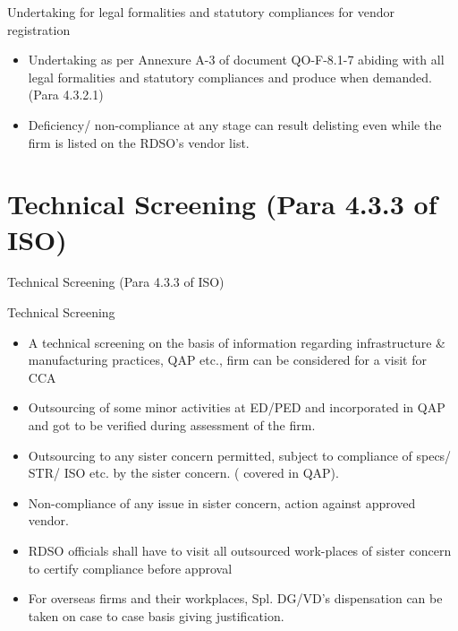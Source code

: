\documentclass[
  10pt,
  ignorenonframetext,
  aspectratio=43,
]{beamer}
\begin{document}
\begin{frame}
\begin{block}{Undertaking for legal formalities and statutory
compliances for vendor registration}
\protect\hypertarget{undertaking-for-legal-formalities-and-statutory-compliances-for-vendor-registration}{}
\begin{itemize}
\item
  Undertaking as per Annexure A-3 of document QO-F-8.1-7 abiding with
  all legal formalities and statutory compliances and produce when
  demanded. (Para 4.3.2.1)
\item
  Deficiency/ non-compliance at any stage can result delisting even
  while the firm is listed on the RDSO's vendor list.
\end{itemize}
\end{block}
\end{frame}

\hypertarget{technical-screening-para-4.3.3-of-iso}{%
\section{Technical Screening (Para 4.3.3 of
ISO)}\label{technical-screening-para-4.3.3-of-iso}}

\begin{frame}{Technical Screening (Para 4.3.3 of ISO)}
\begin{block}{Technical Screening}
\protect\hypertarget{technical-screening}{}
\begin{itemize}
\item
  A technical screening on the basis of information regarding
  infrastructure \& manufacturing practices, QAP etc., firm can be
  considered for a visit for CCA
\item
  Outsourcing of some minor activities at ED/PED and incorporated in QAP
  and got to be verified during assessment of the firm.
\item
  Outsourcing to any sister concern permitted, subject to compliance of
  specs/ STR/ ISO etc. by the sister concern. ( covered in QAP).\\
\item
  Non-compliance of any issue in sister concern, action against approved
  vendor.
\item
  RDSO officials shall have to visit all outsourced work-places of
  sister concern to certify compliance before approval
\item
  For overseas firms and their workplaces, Spl. DG/VD's dispensation can
  be taken on case to case basis giving justification.
\end{itemize}
\end{block}
\end{frame}
\end{document}
